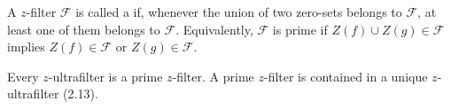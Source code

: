 A $z$-filter $\mathcal{F}$ is called a  if, whenever the union of two zero-sets belongs to $\mathcal{F}$, at least one of them belongs to $\mathcal{F}$. Equivalently, $\mathcal{F}$ is prime if $Z(f) \cup Z(g) \in \mathcal{F}$ implies $Z(f) \in \mathcal{F}$ or $Z(g) \in \mathcal{F}$.

Every $z$-ultrafilter is a prime $z$-filter. A prime $z$-filter is contained in a unique $z$-ultrafilter (2.13).
